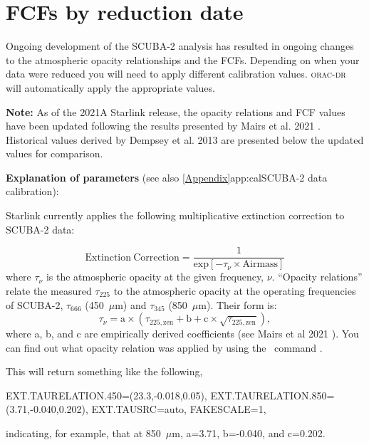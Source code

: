 \chapter{FCFs by reduction date}
\label{app:fcfs}

Ongoing development of the SCUBA-2 analysis has resulted in ongoing
changes to the atmospheric opacity relationships and the FCFs. 
Depending on when your data were reduced you will need to apply 
different calibration values. \textsc{orac-dr} will automatically apply
the appropriate values. 

\textbf{Note:} As of the 2021A Starlink release, the
opacity relations and FCF values have been updated following the
results presented by Mairs et al. 2021 \cite{mairs21}. Historical values derived by Dempsey et al. 2013
\cite{dempsey12} are presented below the updated values for comparison.

\vspace{1cm}

\textbf{Explanation of parameters} (see also \cref{Appendix}{app:cal}{SCUBA-2 data calibration}):

Starlink currently applies the following multiplicative extinction correction to SCUBA-2 data:

\begin{equation}
\mathrm{Extinction\:Correction} = \frac{1}{\mathrm{exp}[-\tau_{\nu}\times\mathrm{Airmass}]}
\end{equation}
where $\tau_{\nu}$ is the atmospheric opacity at the given frequency, $\nu$. ``Opacity relations''
relate the measured $\tau_{225}$ to the atmospheric opacity at the operating frequencies of 
SCUBA-2, $\tau_{666}$ (450~$\mu$m) and $\tau_{345}$ (850~$\mu$m). Their form is:
\begin{equation}
\label{eq:2021taurelation}
\tau_{\nu} = \mathrm{a}\times(\tau_{225,\mathrm{zen}} + \mathrm{b} + \mathrm{c}\times\sqrt{\tau_{225,\mathrm{zen}}}),
\end{equation}
where a, b, and c are empirically derived coefficients (see Mairs et al 2021 \cite{mairs21}).
You can find out what opacity relation was applied by using the \Kappa\ command \hislist.

\begin{terminalv}
\end{terminalv}

This will return something like the following,
\begin{terminalv}
      EXT.TAURELATION.450=(23.3,-0.018,0.05),
      EXT.TAURELATION.850=(3.71,-0.040,0.202), EXT.TAUSRC=auto, FAKESCALE=1,
\end{terminalv}
indicating, for example, that at 850~$\mu$m, a=3.71, b=-0.040, and c=0.202.

